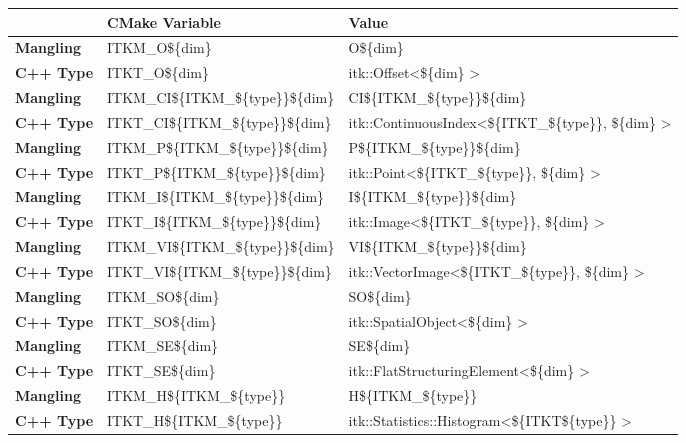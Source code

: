 \begin{table}
\begin{center}
  \small
  \begin{tabular}{l p{} p{}}
\toprule
& \textbf{CMake Variable} & \textbf{Value} \\
\midrule
\midrule
\textbf{Mangling} & ITKM\_O\$\{dim\} & O\$\{dim\} \\
\textbf{C++ Type} & ITKT\_O\$\{dim\} & itk::Offset\textless \$\{dim\} \textgreater\\
\midrule
\textbf{Mangling} & ITKM\_CI\$\{ITKM\_\$\{type\}\}\$\{dim\} & CI\$\{ITKM\_\$\{type\}\}\$\{dim\} \\
\textbf{C++ Type} & ITKT\_CI\$\{ITKM\_\$\{type\}\}\$\{dim\} & itk::ContinuousIndex\textless \$\{ITKT\_\$\{type\}\}, \$\{dim\} \textgreater \\
\midrule
\textbf{Mangling} & ITKM\_P\$\{ITKM\_\$\{type\}\}\$\{dim\} & P\$\{ITKM\_\$\{type\}\}\$\{dim\} \\
\textbf{C++ Type} & ITKT\_P\$\{ITKM\_\$\{type\}\}\$\{dim\} & itk::Point\textless \$\{ITKT\_\$\{type\}\}, \$\{dim\} \textgreater \\
\midrule
\textbf{Mangling} & ITKM\_I\$\{ITKM\_\$\{type\}\}\$\{dim\} & I\$\{ITKM\_\$\{type\}\}\$\{dim\} \\
\textbf{C++ Type} & ITKT\_I\$\{ITKM\_\$\{type\}\}\$\{dim\} & itk::Image\textless \$\{ITKT\_\$\{type\}\}, \$\{dim\} \textgreater \\
\midrule
\textbf{Mangling} & ITKM\_VI\$\{ITKM\_\$\{type\}\}\$\{dim\} & VI\$\{ITKM\_\$\{type\}\}\$\{dim\} \\
\textbf{C++ Type} & ITKT\_VI\$\{ITKM\_\$\{type\}\}\$\{dim\} & itk::VectorImage\textless \$\{ITKT\_\$\{type\}\}, \$\{dim\} \textgreater \\
\midrule
\textbf{Mangling} & ITKM\_SO\$\{dim\} & SO\$\{dim\} \\
\textbf{C++ Type} & ITKT\_SO\$\{dim\} & itk::SpatialObject\textless \$\{dim\} \textgreater\\
\midrule
\textbf{Mangling} & ITKM\_SE\$\{dim\} & SE\$\{dim\} \\
\textbf{C++ Type} & ITKT\_SE\$\{dim\} & itk::FlatStructuringElement\textless \$\{dim\} \textgreater\\
\midrule
\textbf{Mangling} & ITKM\_H\$\{ITKM\_\$\{type\}\} & H\$\{ITKM\_\$\{type\}\} \\
\textbf{C++ Type} & ITKT\_H\$\{ITKM\_\$\{type\}\} & itk::Statistics::Histogram\textless \$\{ITKT\$\{type\}\} \textgreater\\

\end{tabular}
\end{center}
\end{table}
